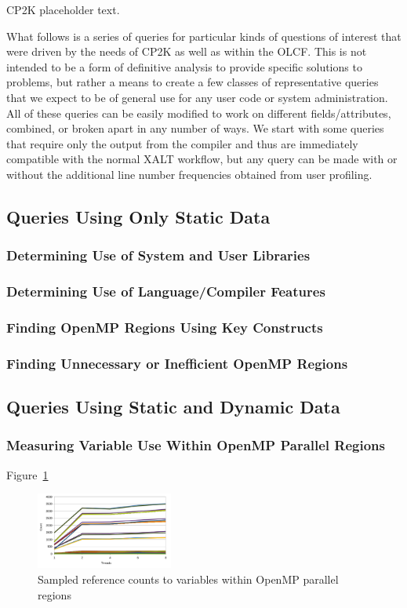 CP2K placeholder text.

What follows is a series of queries for particular kinds of questions of interest that were driven by the needs of CP2K as well as within the \acs{OLCF}.
This is not intended to be a form of definitive analysis to provide specific solutions to problems, but rather a means to create a few classes of representative queries that we expect to be of general use for any user code or system administration.
All of these queries can be easily modified to work on different fields/attributes, combined, or broken apart in any number of ways.
We start with some queries that require only the output from the compiler and thus are immediately compatible with the normal XALT workflow, but any query can be made with or without the additional line number frequencies obtained from user profiling.

\subsection{Queries Using Only Static Data}
\subsubsection{Determining Use of System and User Libraries}
\subsubsection{Determining Use of Language/Compiler Features}
\subsubsection{Finding OpenMP Regions Using Key Constructs}
\subsubsection{Finding Unnecessary or Inefficient OpenMP Regions}

\subsection{Queries Using Static and Dynamic Data}
\subsubsection{Measuring Variable Use Within OpenMP Parallel Regions}

Figure~\ref{fig:openmp-refcount}

\begin{figure}
\begin{center}
\includegraphics[width=0.4\textwidth]{images/cp2k-omp-inc-full.pdf}
\end{center}
\caption{Sampled reference counts to variables within OpenMP parallel regions}
\label{fig:openmp-refcount}
\end{figure}
